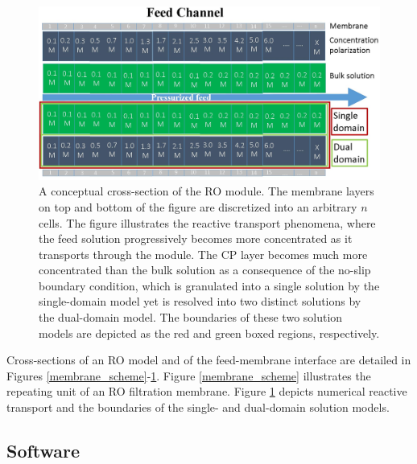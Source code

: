 \begin{figure}[h]
    \centering
    \includegraphics[width = \textwidth]{images/supporting_information/single_dual_domain.jpg}
    \caption{
        A conceptual cross-section of the RO module. The membrane layers on top and bottom of the figure are discretized into an arbitrary $n$ cells. The figure illustrates the reactive transport phenomena, where the feed solution progressively becomes more concentrated as it transports through the module. The CP layer becomes much more concentrated than the bulk solution as a consequence of the no-slip boundary condition, which is granulated into a single solution by the single-domain model  yet is resolved into two distinct solutions by the dual-domain model. The boundaries of these two solution models are depicted as the red and green boxed regions, respectively. 
    }
    \label{single_dual_domain}
\end{figure}

Cross-sections of an RO model and of the feed-membrane interface are detailed in Figures \ref{membrane_scheme}-\ref{single_dual_domain}. Figure \ref{membrane_scheme} illustrates the repeating unit of an RO filtration membrane. Figure \ref{single_dual_domain} depicts numerical reactive transport and the boundaries of the single- and dual-domain solution models.

\subsection{Software}

